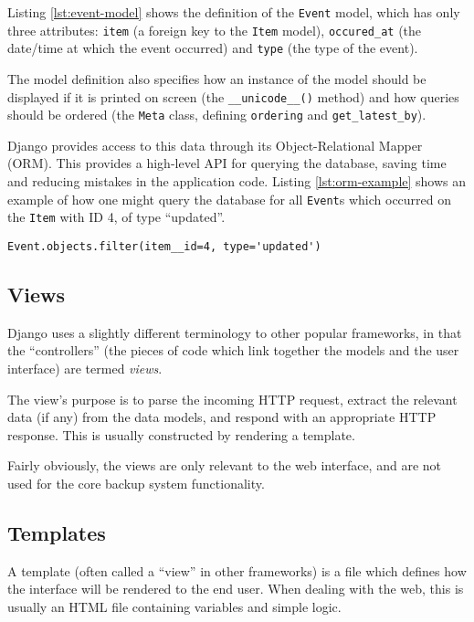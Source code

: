 Listing \ref{lst:event-model} shows the definition of the \verb!Event! model,
which has only three attributes: \verb!item! (a foreign key to the \verb!Item!
model), \verb!occured_at! (the date/time at which the event occurred) and
\verb!type! (the type of the event).

The model definition also specifies how an instance of the model should be
displayed if it is printed on screen (the \verb!__unicode__()! method) and how
queries should be ordered (the \verb!Meta! class, defining \verb!ordering!
and \verb!get_latest_by!).

Django provides access to this data through its Object-Relational Mapper (ORM).
This provides a high-level API for querying the database, saving time and
reducing mistakes in the application code. Listing \ref{lst:orm-example} shows
an example of how one might query the database for all \verb!Event!s which
occurred on the \verb!Item! with ID 4, of type ``updated''.

\begin{singlespacing}
\begin{lstlisting}[caption=Querying for all ``updated'' Events on Item 4,
    label=lst:orm-example]
    Event.objects.filter(item__id=4, type='updated')
\end{lstlisting}
\end{singlespacing}

\subsection{Views}

Django uses a slightly different terminology to other popular frameworks, in
that the ``controllers'' (the pieces of code which link together the models and
the user interface) are termed \emph{views}.

The view's purpose is to parse the incoming HTTP request, extract the relevant
data (if any) from the data models, and respond with an appropriate HTTP
response. This is usually constructed by rendering a template.

Fairly obviously, the views are only relevant to the web interface, and are not
used for the core backup system functionality.

\subsection{Templates}

A template (often called a ``view'' in other frameworks) is a file which
defines how the interface will be rendered to the end user. When dealing with
the web, this is usually an HTML file containing variables and simple logic.

